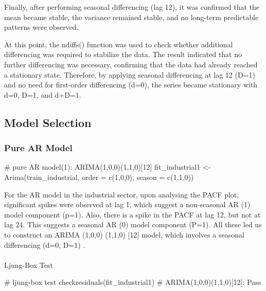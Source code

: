 \documentclass[
  letterpaper,
  DIV=11,
  numbers=noendperiod]{scrartcl}
\makeatletter
\let\oldparagraph\paragraph
\renewcommand{\paragraph}{
    \@ifstar
      \xxxParagraphStar
      \xxxParagraphNoStar
  }
\newcommand{\xxxParagraphStar}[1]{\oldparagraph*{#1}\mbox{}}
\newcommand{\xxxParagraphNoStar}[1]{\oldparagraph{#1}\mbox{}}
\newenvironment{Shaded}{\begin{snugshade}}{\end{snugshade}}
\newcommand{\AttributeTok}[1]{\textcolor[rgb]{0.40,0.45,0.13}{#1}}
\newcommand{\CommentTok}[1]{\textcolor[rgb]{0.37,0.37,0.37}{#1}}
\newcommand{\DecValTok}[1]{\textcolor[rgb]{0.68,0.00,0.00}{#1}}
\newcommand{\FunctionTok}[1]{\textcolor[rgb]{0.28,0.35,0.67}{#1}}
\newcommand{\NormalTok}[1]{\textcolor[rgb]{0.00,0.23,0.31}{#1}}
\newcommand{\OtherTok}[1]{\textcolor[rgb]{0.00,0.23,0.31}{#1}}
\makeatother
\begin{document}
Finally, after performing seasonal differencing (lag 12), it was
confirmed that the mean became stable, the variance remained stable, and
no long-term predictable patterns were observed.

At this point, the ndiffs() function was used to check whether
additional differencing was required to stabilize the data. The result
indicated that no further differencing was necessary, confirming that
the data had already reached a stationary state. Therefore, by applying
seasonal differencing at lag 12 (D=1) and no need for first-order
differencing (d=0), the series became stationary with d=0, D=1, and
d+D=1.

\subsection{Model Selection}\label{model-selection}

\subsubsection{Pure AR Model}\label{pure-ar-model}

\begin{Shaded}
\begin{Highlighting}[]
\CommentTok{\# pure AR model(1): ARIMA(1,0,0)(1,1,0)[12]}
\NormalTok{fit\_industrial1 }\OtherTok{\textless{}{-}} \FunctionTok{Arima}\NormalTok{(train\_industrial, }\AttributeTok{order =} \FunctionTok{c}\NormalTok{(}\DecValTok{1}\NormalTok{,}\DecValTok{0}\NormalTok{,}\DecValTok{0}\NormalTok{), }\AttributeTok{season =} \FunctionTok{c}\NormalTok{(}\DecValTok{1}\NormalTok{,}\DecValTok{1}\NormalTok{,}\DecValTok{0}\NormalTok{))}
\end{Highlighting}
\end{Shaded}

For the AR model in the industrial sector, upon analysing the PACF plot,
significant spikes were observed at lag 1, which suggest a non-seasonal
AR (1) model component (p=1). Also, there is a spike in the PACF at lag
12, but not at lag 24. This suggests a seasonal AR (0) model component
(P=1). All these led us to construct an ARIMA (1,0,0) (1,1,0) {[}12{]}
model, which involves a seasonal differencing (d=0, D=1) .

\paragraph{Ljung-Box Test}\label{ljung-box-test}

\begin{Shaded}
\begin{Highlighting}[]
\CommentTok{\# ljung{-}box test}
\FunctionTok{checkresiduals}\NormalTok{(fit\_industrial1) }\CommentTok{\# ARIMA(1,0,0)(1,1,0)[12]: Pass}
\end{Highlighting}
\end{Shaded}
\end{document}
